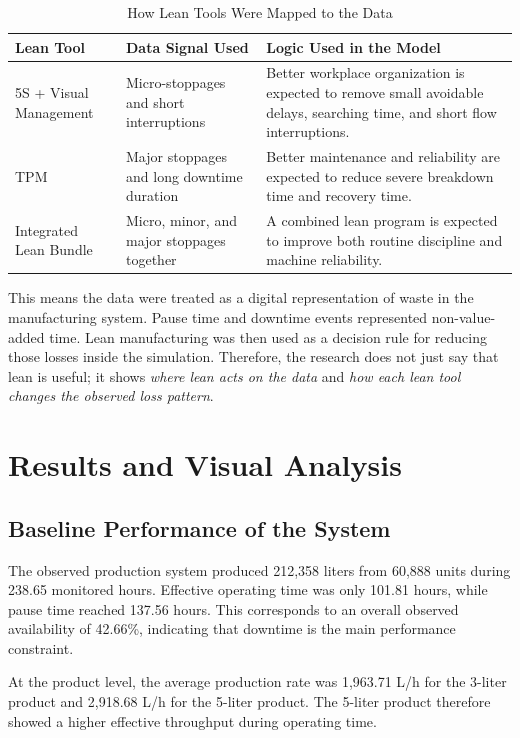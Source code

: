 \documentclass[12pt,a4paper]{article}
\begin{document}
\begin{table}[H]
\centering
\caption{How Lean Tools Were Mapped to the Data}
\begin{tabular}{p{3.2cm}p{4.2cm}p{6.5cm}}
\toprule
\textbf{Lean Tool} & \textbf{Data Signal Used} & \textbf{Logic Used in the Model} \\
\midrule
5S + Visual Management & Micro-stoppages and short interruptions & Better workplace organization is expected to remove small avoidable delays, searching time, and short flow interruptions. \\
TPM & Major stoppages and long downtime duration & Better maintenance and reliability are expected to reduce severe breakdown time and recovery time. \\
Integrated Lean Bundle & Micro, minor, and major stoppages together & A combined lean program is expected to improve both routine discipline and machine reliability. \\
\bottomrule
\end{tabular}
\end{table}

This means the data were treated as a digital representation of waste in the manufacturing system. Pause time and downtime events represented non-value-added time. Lean manufacturing was then used as a decision rule for reducing those losses inside the simulation. Therefore, the research does not just say that lean is useful; it shows \textit{where lean acts on the data} and \textit{how each lean tool changes the observed loss pattern}.

\section{Results and Visual Analysis}
\subsection{Baseline Performance of the System}
The observed production system produced 212,358 liters from 60,888 units during 238.65 monitored hours. Effective operating time was only 101.81 hours, while pause time reached 137.56 hours. This corresponds to an overall observed availability of 42.66\%, indicating that downtime is the main performance constraint.

At the product level, the average production rate was 1,963.71 L/h for the 3-liter product and 2,918.68 L/h for the 5-liter product. The 5-liter product therefore showed a higher effective throughput during operating time.
\end{document}
